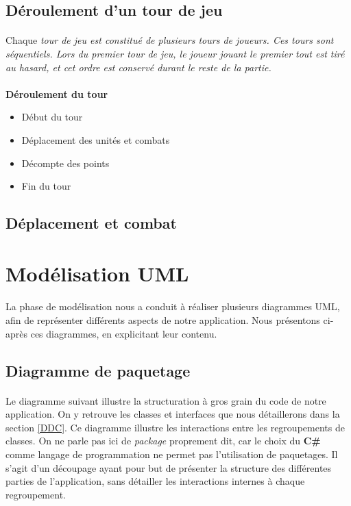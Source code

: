 \documentclass[a4paper]{article}
\begin{document}
\subsection{Déroulement d'un tour de jeu}
\paragraph{}
Chaque \em{tour de jeu} est constitué de plusieurs \em{tours de joueurs}. Ces tours sont séquentiels. Lors du premier tour de jeu, le joueur jouant le premier tout est tiré au hasard, et cet ordre est conservé durant le reste de la partie.
\paragraph{}
\textbf{Déroulement du tour}
\begin{itemize}
    \item Début du tour
    \item Déplacement des unités et combats
    \item Décompte des points
    \item Fin du tour
\end{itemize}

\subsection{Déplacement et combat}


\section{Modélisation UML}
\paragraph{}
La phase de modélisation nous a conduit à réaliser plusieurs diagrammes UML, afin de représenter différents aspects de notre application. Nous présentons ci-après ces diagrammes, en explicitant leur contenu.

\subsection{Diagramme de paquetage}
\paragraph{}
Le diagramme suivant illustre la structuration à gros grain du code de notre application. On y retrouve les classes et interfaces que nous détaillerons dans la section \ref{DDC}. Ce diagramme illustre les interactions entre les regroupements de classes. On ne parle pas ici de \textit{package} proprement dit, car le choix du \textbf{C\#} comme langage de programmation ne permet pas l'utilisation de paquetages. Il s'agit d'un découpage ayant pour but de présenter la structure des différentes parties de l'application, sans détailler les interactions internes à chaque regroupement.
\end{document}
